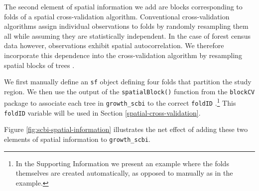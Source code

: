 \documentclass[12pt]{article}
\newenvironment{Shaded}{\begin{snugshade}}{\end{snugshade}}
\newcommand{\CommentTok}[1]{\textcolor[rgb]{0.56,0.35,0.01}{\textit{#1}}}
\newcommand{\DataTypeTok}[1]{\textcolor[rgb]{0.13,0.29,0.53}{#1}}
\newcommand{\DecValTok}[1]{\textcolor[rgb]{0.00,0.00,0.81}{#1}}
\newcommand{\FloatTok}[1]{\textcolor[rgb]{0.00,0.00,0.81}{#1}}
\newcommand{\KeywordTok}[1]{\textcolor[rgb]{0.13,0.29,0.53}{\textbf{#1}}}
\newcommand{\NormalTok}[1]{#1}
\newcommand{\OperatorTok}[1]{\textcolor[rgb]{0.81,0.36,0.00}{\textbf{#1}}}
\newcommand{\StringTok}[1]{\textcolor[rgb]{0.31,0.60,0.02}{#1}}
\begin{document}
\begin{Shaded}
\end{Shaded}

The second element of spatial information we add are blocks
corresponding to folds of a spatial cross-validation algorithm.
Conventional cross-validation algorithms assign individual observations
to folds by randomly resampling them all while assuming they are
statistically independent. In the case of forest census data however,
observations exhibit spatial autocorrelation. We therefore incorporate
this dependence into the cross-validation algorithm by resampling
spatial blocks of trees \citep[
\citet{pohjankukka_estimating_2017}]{roberts_cross-validation_2017}.

We first manually define an \texttt{sf} object defining four folds that
partition the study region. We then use the output of the
\texttt{spatialBlock()} function from the \texttt{blockCV} package to
associate each tree in \texttt{growth\_scbi} to the correct
\texttt{foldID} \citep{valavi_blockcv_2019}.\footnote{In the Supporting
  Information we present an example where the folds themselves are
  created automatically, as opposed to manually as in the example.} This
\texttt{foldID} variable will be used in Section
\ref{spatial-cross-validation}.

Figure \ref{fig:scbi-spatial-information} illustrates the net effect of
adding these two elements of spatial information to
\texttt{growth\_scbi}.
\end{document}
